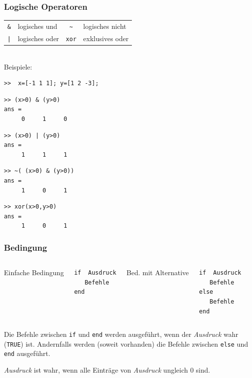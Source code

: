 \begin{frame}[fragile]\frametitle{Logische Operatoren}
\begin{tabular}{|c|l||c|l|}
\hline
\lstinline!&! & logisches und & \lstinline!~! & logisches nicht \\
\lstinline!|! & logisches oder & \lstinline!xor! & exklusives oder\\
\hline
\end{tabular}
\\
Beispiele:\\
\begin{lstlisting} 
>>  x=[-1 1 1]; y=[1 2 -3];
\end{lstlisting}
\vspace*{0.5cm}
\begin{minipage}{5cm}
\begin{lstlisting}
>> (x>0) & (y>0)
ans =
     0     1     0
\end{lstlisting}
\vspace*{0.5cm}
\begin{lstlisting}
>> (x>0) | (y>0)
ans =
     1     1     1
\end{lstlisting}
\end{minipage} \hfill
\begin{minipage}{5cm}
\begin{lstlisting}
>> ~( (x>0) & (y>0))
ans =
     1     0     1
\end{lstlisting}
\vspace*{0.5cm}
\begin{lstlisting}
>> xor(x>0,y>0)
ans =
     1     0     1
\end{lstlisting}
\end{minipage}
\end{frame}
%
%
%
\begin{frame}[fragile]\frametitle{Bedingung}
\begin{columns}[t,onlytextwidth]
Einfache Bedingung
\begin{lstlisting}
if  Ausdruck
   Befehle
end
\end{lstlisting}
Bed. mit Alternative
\begin{lstlisting}
if  Ausdruck
   Befehle
else
   Befehle
end
\end{lstlisting}
\end{columns}

Die Befehle zwischen \lstinline!if! und \lstinline!end! werden ausgeführt, wenn
der {\it Ausdruck} wahr (\lstinline!TRUE!) ist. 
Andernfalls werden (soweit vorhanden) die
Befehle zwischen \lstinline!else! und \lstinline!end! ausgeführt.

{\it Ausdruck} ist wahr, wenn   alle Einträge von {\it
  Ausdruck} ungleich $0$ sind.
\end{frame}
